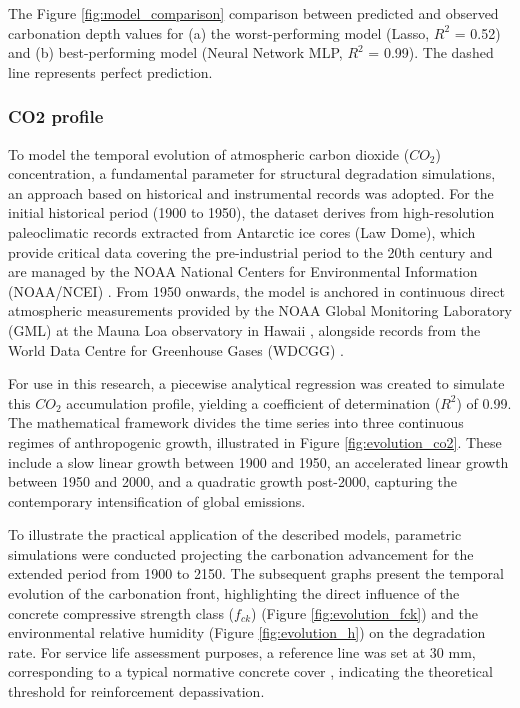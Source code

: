 The Figure \ref{fig:model_comparison} comparison between predicted and observed carbonation depth values for (a) the worst-performing model (Lasso, $R^2$ = 0.52) and (b) best-performing model (Neural Network MLP, $R^2$ = 0.99). The dashed line represents perfect prediction.

\subsubsection{CO2 profile}
To model the temporal evolution of atmospheric carbon dioxide ($CO_2$) concentration, a fundamental parameter for structural degradation simulations, an approach based on historical and instrumental records was adopted. For the initial historical period (1900 to 1950), the dataset derives from high-resolution paleoclimatic records extracted from Antarctic ice cores (Law Dome), which provide critical data covering the pre-industrial period to the 20th century and are managed by the NOAA National Centers for Environmental Information (NOAA/NCEI) \cite{noaa_law_dome}. From 1950 onwards, the model is anchored in continuous direct atmospheric measurements provided by the NOAA Global Monitoring Laboratory (GML) at the Mauna Loa observatory in Hawaii \cite{noaa_gml}, alongside records from the World Data Centre for Greenhouse Gases (WDCGG) \cite{wmo_wdcgg}.

For use in this research, a piecewise analytical regression was created to simulate this $CO_2$ accumulation profile, yielding a coefficient of determination ($R^2$) of 0.99. The mathematical framework divides the time series into three continuous regimes of anthropogenic growth, illustrated in Figure \ref{fig:evolution_co2}. These include a slow linear growth between 1900 and 1950, an accelerated linear growth between 1950 and 2000, and a quadratic growth post-2000, capturing the contemporary intensification of global emissions.

To illustrate the practical application of the described models, parametric simulations were conducted projecting the carbonation advancement for the extended period from 1900 to 2150. The subsequent graphs present the temporal evolution of the carbonation front, highlighting the direct influence of the concrete compressive strength class ($f_{ck}$) (Figure \ref{fig:evolution_fck}) and the environmental relative humidity (Figure \ref{fig:evolution_h}) on the degradation rate. For service life assessment purposes, a reference line was set at 30 mm, corresponding to a typical normative concrete cover \cite{nbr6118}, indicating the theoretical threshold for reinforcement depassivation.

